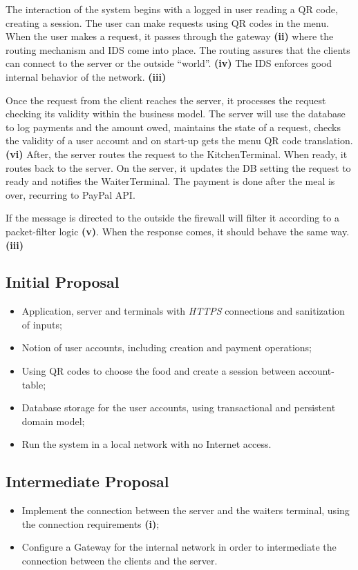 \documentclass[12pt,paper=a4]{article}
\begin{document}
The interaction of the system begins with a logged in user reading a QR code, creating a session. The user can make requests using QR codes in the menu. When the user makes a request, it passes through the gateway \textbf{(ii)} where the routing mechanism and IDS come into place. The routing assures that the clients can connect to the server or the outside “world”. \textbf{(iv)} The IDS enforces good internal behavior of the network. \textbf{(iii)}

Once the request from the client reaches the server, it processes the request checking its validity within the business model. The server will use the database to log payments and the amount owed, maintains the state of a request, checks the validity of a user account and on start-up gets the menu QR code translation. \textbf{(vi)} After, the server routes the request to the KitchenTerminal. When ready, it routes back to the server. On the server, it updates the DB setting the request to ready and notifies the WaiterTerminal. The payment is done after the meal is over, recurring to PayPal API.

If the message is directed to the outside the firewall will filter it according to a packet-filter logic \textbf{(v)}. When the response comes, it should behave the same way. \textbf{(iii)}

\subsection{Initial Proposal}
\begin{itemize}
\item[\ding{51}] Application, server and terminals with \textit{HTTPS} connections and sanitization of inputs;
\item[\ding{51}] Notion of user accounts, including creation and payment operations;
\item[\ding{51}] Using QR codes to choose the food and create a session between account-table;
\item[\ding{51}] Database storage for the user accounts, using transactional and persistent domain model;
\item[\ding{51}] Run the system in a local network with no Internet access.
\end{itemize}

\subsection{Intermediate Proposal}
\begin{itemize}
\item[\ding{51}] Implement the connection between the server and the waiters terminal, using the connection requirements \textbf{(i)};
\item[\ding{51}] Configure a Gateway for the internal network in order to intermediate the connection between the clients and the server.
\end{itemize}
\end{document}
